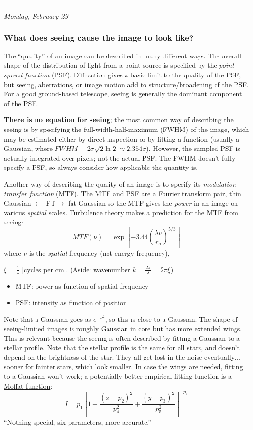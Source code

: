 \documentclass[12pt]{article}
\newcommand{\mynotes}[1]{\textcolor{myBlue}{#1}}
\newcommand{\mydate}[1]{
    \begin{flushright}
        \rule{\textwidth}{0.4pt} %
        \footnotesize\hfill\textit{#1}
    \end{flushright}}
\begin{document}
\mydate{Monday, February 29}
\subsubsection{What does seeing cause the image to look like?}
The ``quality'' of an image can be described in many different ways. The
overall shape of the distribution of light from a point source is specified by
the \textit{point spread function} (PSF). Diffraction gives a basic limit to
the quality of the PSF, but seeing, aberrations, or image motion add to
structure/broadening of the PSF\@. For a good ground-based telescope, seeing is
generally the dominant component of the PSF.

\textbf{There is no equation for seeing};
the most common way of describing the seeing is by specifying the
full-width-half-maximum (FWHM) of the image, which may be estimated either by
direct inspection or by fitting a function (usually a Gaussian, where $FWHM =
2\sigma\sqrt{2\ln{2}} \approx 2.354\sigma$). However, the sampled PSF is actually
integrated over pixels; not the actual PSF\@. The FWHM doesn't fully specify a PSF, so
always consider how applicable the quantity is.

Another way of describing the quality of an image is to specify its
\textit{modulation transfer function} (MTF). The MTF and PSF are a Fourier
transform pair, \mynotes{thin Gaussian $\leftarrow$\small
FT\normalsize$\rightarrow$ fat Gaussian} so the MTF gives the \textit{power} in
an image on various \textit{spatial} scales. Turbulence theory makes a
prediction for the MTF from seeing:
\[
    MTF(\nu)
    = \exp \left[ -3.44 \left( \frac{\lambda\nu}{r_{o}} \right) ^{5/3} \right]
    \]
where $\nu$ is the \emph{spatial} frequency (not energy frequency),
\mynotes{$\xi = \frac{1}{\lambda}$ [cycles per cm].
(Aside: wavenumber $k = \frac{2\pi}{\lambda} = 2\pi\xi$)
\begin{itemize}
    \item MTF: power as function of spatial frequency
    \item PSF: intensity as function of position
\end{itemize}}

Note that a Gaussian goes as $e^{-\nu^{2}}$, so this is close to a Gaussian.
The shape of seeing-limited images is roughly Gaussian in core but has more
\href{http://astronomy.nmsu.edu/holtz/a535/html/diagrams/a535/racine2.htm}
{extended wings}. This is relevant because the seeing is often described by
fitting a Gaussian to a stellar profile. \mynotes{Note that the stellar profile
is the same for all stars, and doesn't depend on the brightness of the star.
They all get lost in the noise eventually$\ldots$ sooner for fainter stars,
which look smaller. In case the wings are needed, fitting to a Gaussian won't
work;} a potentially better empirical fitting
function is a \href{http://astronomy.nmsu.edu/holtz/a535/html/diagrams/a535/racine3.htm}
{Moffat function}:
\[
    I = p_{1} \left[
        1 + \frac{ \left( x-p_{2} \right) ^{2}}{p_{4}^{2}} +
        \frac{ \left( y-p_{3} \right) ^{2}}{p_{5}^{2}} \right] ^{-p_{6}}
    \]
``Nothing special, six parameters, more accurate.''
\end{document}
